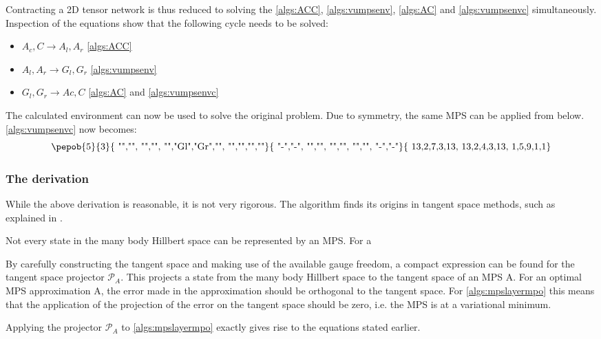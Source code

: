 
Contracting a 2D tensor network is thus reduced to solving the  \cref{algs:ACC}, \cref{algs:vumpsenv}, \cref{algs:AC} and \cref{algs:vumpsenvc} simultaneously. Inspection of the equations show that the following cycle needs to be solved:

\begin{itemize}
    \item  $A_c,C  \rightarrow A_l,A_r  $  \cref{algs:ACC}
    \item  $A_l,A_r  \rightarrow G_l,G_r  $ \cref{algs:vumpsenv}
    \item  $ G_l,G_r   \rightarrow Ac,C $ \cref{algs:AC} and  \cref{algs:vumpsenvc}
\end{itemize}

The calculated environment can now be used to solve the original problem. Due to symmetry, the same MPS can be applied from below. \cref{algs:vumpsenvc} now becomes:
\begin{equation}
    \vcenter{ \hbox{   \pepob{5}{3}{{
                        "","", "","",
                        "","Gl","Gr","",
                        "","","",""}}{{
                        "-","-",
                        "","",
                        "","",
                        "","",
                        "-","-"}}{{
                        13,2,7,3,13,
                        13,2,4,3,13,
                        1,5,9,1,1}} }}
\end{equation}

\subsubsection{The derivation}
While the above derivation is reasonable, it is not very rigorous. The algorithm finds its origins  in tangent space methods, such as explained in \cite{Vanderstraeten2019}.

Not every state in the many body Hillbert space can be represented by an MPS. For a

By carefully constructing the tangent space and making use of the available gauge freedom, a compact expression can be found for the tangent space projector $\mathcal{P}_A$. This projects a state from the many body Hillbert space to the tangent space of an MPS A. For an optimal MPS approximation A, the error made in the approximation should be orthogonal to the tangent space. For \cref{algs:mpslayermpo} this means that the application of the projection of the error on the tangent space should be zero, i.e. the MPS is at a variational minimum.  \cite{Nietner2020}

Applying the projector $\mathcal{P}_A$ to \cref{algs:mpslayermpo} exactly gives rise to the equations stated earlier.

